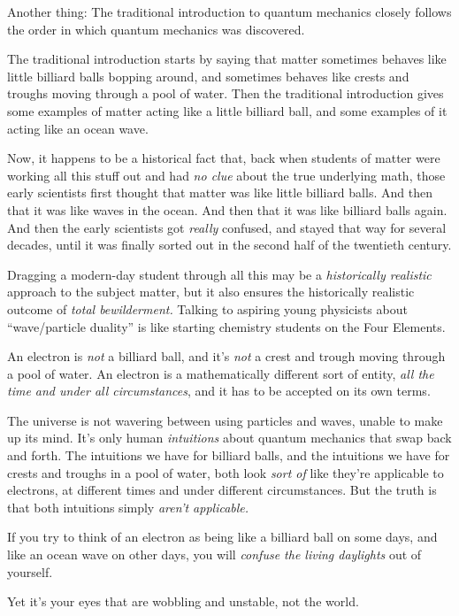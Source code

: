 {
 Another thing: The traditional introduction to quantum mechanics
closely follows the order in which quantum mechanics was discovered.}

{
 The traditional introduction starts by saying that matter
sometimes behaves like little billiard balls bopping around, and
sometimes behaves like crests and troughs moving through a pool of
water. Then the traditional introduction gives some examples of matter
acting like a little billiard ball, and some examples of it acting like
an ocean wave.}

{
 Now, it happens to be a historical fact that, back when students
of matter were working all this stuff out and had \textit{no clue}
about the true underlying math, those early scientists first thought
that matter was like little billiard balls. And then that it was like
waves in the ocean. And then that it was like billiard balls again. And
then the early scientists got \textit{really} confused, and stayed that
way for several decades, until it was finally sorted out in the second
half of the twentieth century.}

{
 Dragging a modern-day student through all this may be a
\textit{historically realistic} approach to the subject matter, but it
also ensures the historically realistic outcome of \textit{total
bewilderment.} Talking to aspiring young physicists about
``wave/particle duality'' is like
starting chemistry students on the Four Elements.}

{
 An electron is \textit{not} a billiard ball, and
it's \textit{not} a crest and trough moving through a
pool of water. An electron is a mathematically different sort of
entity, \textit{all the time and under all circumstances}, and it has
to be accepted on its own terms.}

{
 The universe is not wavering between using particles and waves,
unable to make up its mind. It's only human
\textit{intuitions} about quantum mechanics that swap back and forth.
The intuitions we have for billiard balls, and the intuitions we have
for crests and troughs in a pool of water, both look \textit{sort of}
like they're applicable to electrons, at different
times and under different circumstances. But the truth is that both
intuitions simply \textit{aren't applicable.}}

{
 If you try to think of an electron as being like a billiard ball
on some days, and like an ocean wave on other days, you will
\textit{confuse the living daylights} out of yourself.}

{
 Yet it's your eyes that are wobbling and unstable,
not the world.}


